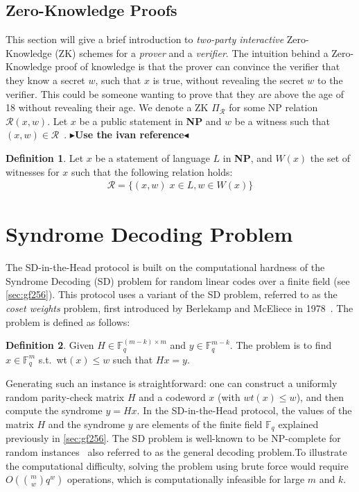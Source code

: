 \documentclass[11pt]{report}
\theoremstyle{definition}
\newtheorem{definition}{Definition}[section]
\theoremstyle{plain}
\newcommand{\todo}[1]{{\color[rgb]{.5,0,0}\textbf{$\blacktriangleright$#1$\blacktriangleleft$}}}
\begin{document}
\subsection{Zero-Knowledge Proofs}\label{sec:zk}
This section will give a brief introduction to \textit{two-party interactive} Zero-Knowledge (ZK) schemes for a \textit{prover} and a \textit{verifier}. The intuition behind a Zero-Knowledge proof of knowledge is that the prover can convince the verifier that they know a secret $w$, such that $x$ is true, without revealing the secret $w$ to the verifier. This could be someone wanting to prove that they are above the age of 18 without revealing their age. We denote a ZK $\Pi_{\mathcal{R}}$ for some NP relation $\mathcal{R}(x, w)$. Let $x$ be a public statement in \textbf{NP} and $w$ be a witness such that $(x, w) \in \mathcal{R}$~\cite{feneuil2023threshold}.
\todo{Use the ivan reference}

\begin{definition}
  Let $x$ be a statement of language $L$ in \textbf{NP}, and $W(x)$ the set of witnesses for $x$ such that the following relation holds:
  \begin{align*}
    \mathcal{R} = \{(x, w)\; x \in L, w \in W(x)\}
  \end{align*}
\end{definition}

\section{Syndrome Decoding Problem}\label{sec:syndrome}

The SD-in-the-Head protocol is built on the computational hardness of the Syndrome Decoding (SD) problem for random linear codes over a finite field (see \autoref{sec:gf256}). This protocol uses a variant of the SD problem, referred to as the \textit{coset weights} problem, first introduced by Berlekamp and McEliece in 1978~\cite{berlekamp1978inherent}. The problem is defined as follows:
\begin{definition}\label{def:syndrome}
  Given $H \in \mathbb{F}^{(m-k)\times m}_q$ and $y \in \mathbb{F}^{m-k}_q$. The problem is to find $x \in \mathbb{F}^m_q$ s.t.\ wt$(x) \leq w$ such that $Hx = y$.
\end{definition}
Generating such an instance is straightforward: one can construct a uniformly random parity-check matrix $H$ and a codeword $x$ (with $wt(x) \leq w$), and then compute the syndrome $y = Hx$. In the SD-in-the-Head protocol, the values of the matrix $H$ and the syndrome $y$ are elements of the finite field $\mathbb{F}_q$ explained previously in \autoref{sec:gf256}. The SD problem is well-known to be NP-complete for random instances~\cite{berlekamp1978inherent} also referred to as the general decoding problem.To illustrate the computational difficulty, solving the problem using brute force would require $O(\binom{m}{w} q^w)$ operations, which is computationally infeasible for large $m$ and $k$.
\end{document}
